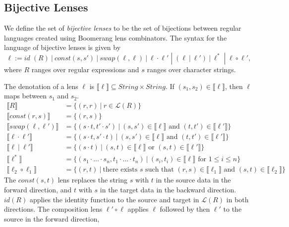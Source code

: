 \documentclass[acmsmall,review,anonymous]{acmart}
\newcommand{\sep}{\ensuremath{\ | \ }}
\begin{document}
\subsection{Bijective Lenses}
We define the set of \textit{bijective lenses} to be the set of bijections
between regular languages created using Boomerang lens combinators.
The syntax for the language of bijective lenses is given by
$$\ell := \mathit{id} \; (R) \sep const(s, s') \sep  swap(\ell,
\ell) \sep \ell \cdot \ell' \; |  \; (\ell \sep \ell') \sep \ell^* \;
| \; \ell \circ \ell',$$ where $R$ ranges over regular expressions and $s$
ranges over character strings.

The denotation of a lens $\ell$ is $\llbracket \ell \rrbracket \subseteq
\mathit{String} \times \mathit{String}$. If $(s_1, s_2) \in \llbracket \ell
\rrbracket$, then $\ell$ maps between $s_1$ and $s_2$.
\begin{align*}
\llbracket R \rrbracket &= \{(r, r) \sep r \in \mathcal{L}(R)\}\\
\llbracket const(r, s) \rrbracket &= \{(r, s)\}\\
\llbracket swap(\ell, \ell') \rrbracket &= \{(s \cdot t, t' \cdot s') \sep
(s, s') \in \llbracket \ell \rrbracket \text{ and } (t, t') \in \llbracket
\ell' \rrbracket\}\\
\llbracket \ell \cdot \ell' \rrbracket &= \{(s \cdot t, s' \cdot t) \sep
(s, s') \in \llbracket \ell \rrbracket \text{ and } (t, t') \in \llbracket
\ell' \rrbracket\}\\
\llbracket \ell \sep \ell' \rrbracket &= \{(s \cdot t) \sep
(s, t) \in \llbracket \ell \rrbracket \text{ or } (s, t) \in \llbracket
\ell' \rrbracket\}\\
\llbracket \ell^* \rrbracket &= \{(s_1 \cdot \ldots \cdot s_n, t_1 \cdot \ldots
\cdot t_n) \sep (s_i, t_i) \in \llbracket \ell \rrbracket \text{ for } 1
\leq i \leq n\}\\
\llbracket \ell_2 \circ \ell_1 \rrbracket &= \{(r, t) \sep \text{there exists }s
\text{ such that } (r, s) \in \llbracket \ell_1 \rrbracket \text{ and } (s, t)
\in \llbracket \ell_2 \rrbracket\}
\end{align*}
The $\mathit{const}(s, t)$ lens replaces the string $s$ with $t$ in the source
data in the forward direction, and $t$ with $s$ in the target data in the backward
direction. $\mathit{id}(R)$ applies the identity function to the source and target
in $\mathcal{L}(R)$ in both directions. The composition lens $\ell' \circ \ell$
applies $\ell$ followed by then $\ell'$ to the source in the forward direction,
\end{document}
